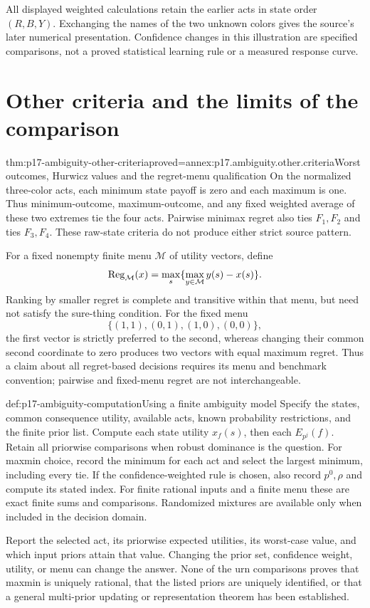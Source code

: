 All displayed weighted calculations retain the earlier acts
in state order \((R,B,Y)\). Exchanging the names of the two
unknown colors gives the source's later numerical presentation.
Confidence changes in this
illustration are specified comparisons, not a proved statistical
learning rule or a measured response curve.

\section{Other criteria and the limits of the comparison}

\begin{hbtheorem}{thm:p17-ambiguity-other-criteria}{proved=annex:p17.ambiguity.other.criteria}{Worst outcomes, Hurwicz values and the regret-menu qualification}
On the normalized three-color acts, each minimum state payoff
is zero and each maximum is one. Thus minimum-outcome,
maximum-outcome, and any fixed weighted average of these
two extremes tie the four acts. Pairwise minimax regret
also ties \(F_1,F_2\) and ties \(F_3,F_4\).
These raw-state criteria do not produce either strict source pattern.

For a fixed nonempty finite menu \(\mathcal M\) of utility vectors, define
\[
        {\rm Reg}_{\mathcal M}(x)
                 =\max_s\{\max_{y\in\mathcal M}y(s)-x(s)\}.
\]
Ranking by smaller regret is complete and transitive within
that menu, but need not satisfy the sure-thing condition.
For the fixed menu
\[
        \{(1,1),(0,1),(1,0),(0,0)\},
\]
the first vector is strictly preferred to the second,
whereas changing their common second coordinate to zero
produces two vectors with equal maximum regret.
Thus a claim about all regret-based decisions requires its
menu and benchmark convention; pairwise and fixed-menu
regret are not interchangeable.
\end{hbtheorem}

\begin{hbmethod}{def:p17-ambiguity-computation}{Using a finite ambiguity model}
Specify the states, common consequence utility, available acts,
known probability restrictions, and the finite prior list.
Compute each state utility \(x_f(s)\), then each \(E_{p^j}(f)\).
Retain all priorwise comparisons when robust dominance is the
question. For maxmin choice, record the minimum for each act
and select the largest minimum, including every tie.
If the confidence-weighted rule is chosen, also record
\(p^0,\rho\) and compute its stated index.
For finite rational inputs and a finite menu these are exact
finite sums and comparisons. Randomized mixtures are available
only when included in the decision domain.

Report the selected act, its priorwise expected utilities,
its worst-case value, and which input priors attain that value.
Changing the prior set, confidence weight, utility, or menu
can change the answer. None of the urn comparisons proves that
maxmin is uniquely rational, that the listed priors are uniquely
identified, or that a general multi-prior updating or representation
theorem has been established.
\end{hbmethod}
